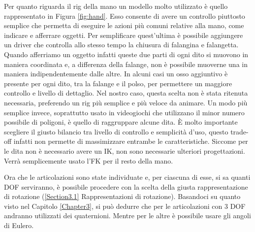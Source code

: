 \newpage
Per quanto riguarda il rig della mano un modello molto utilizzato è quello rappresentato in Figura \ref{fig:hand}.
Esso consente di avere un controllo piuttosto semplice che permetta di eseguire le azioni più comuni relative alla mano, come indicare e afferrare oggetti.
Per semplificare quest'ultima è possibile aggiungere un driver che controlla allo stesso tempo la chiusura di falangina e falangetta.
Quando afferriamo un oggetto infatti queste due parti di ogni dito si muovono in maniera coordinata e, a differenza della falange, non è possibile muoverne una in maniera indipendentemente dalle altre. 
In alcuni casi un osso aggiuntivo è presente per ogni dito, tra la falange e il polso, per permettere un maggiore controllo e livello di dettaglio.
Nel nostro caso, questa scelta non è stata ritenuta necessaria, preferendo un rig più semplice e più veloce da animare. 
Un modo più semplice invece, soprattutto usato in videogiochi che utilizzano il minor numero possibile di poligoni, è quello di raggruppare alcune dita.
È molto importante scegliere il giusto bilancio tra livello di controllo e semplicità d'uso, questo trade-off infatti non permette di massimizzare entrambe le caratteristiche.
Siccome per le dita non è necessario avere un IK, non sono necessarie ulteriori progettazioni. Verrà semplicemente usato l'FK per il resto della mano.

Ora che le articolazioni sono state individuate e, per ciascuna di esse, si sa quanti DOF serviranno, è possibile procedere con la scelta della giusta rappresentazione di rotazione (\ref{Section3.1} Rappresentazioni di rotazione).
Basandoci su quanto visto nel Capitolo \ref{Chapter3}, si può dedurre che per le articolazioni con 3 DOF andranno utilizzati dei quaternioni. Mentre per le altre è possibile usare gli angoli di Eulero.


